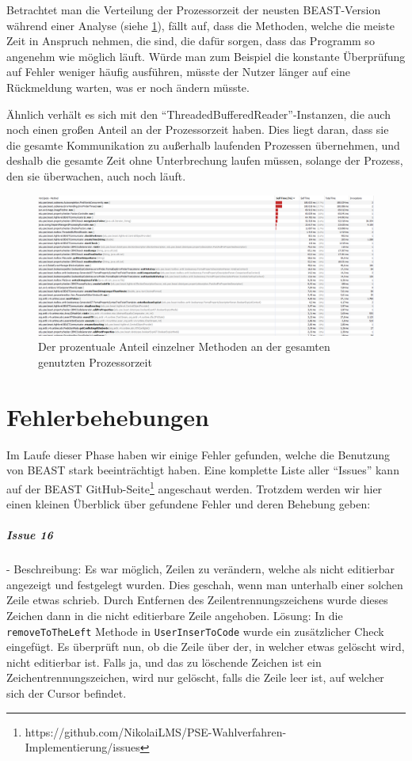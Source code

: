 \documentclass[a4paper]{scrreprt}
\begin{document}
\newpage
Betrachtet man die Verteilung der Prozessorzeit der neusten BEAST-Version während einer
Analyse (siehe \ref{fig5}), fällt auf, dass die Methoden, welche die meiste
Zeit in Anspruch nehmen, die sind, die dafür sorgen, dass das Programm
so angenehm wie möglich läuft. Würde man zum Beispiel die konstante
Überprüfung auf Fehler weniger häufig ausführen, müsste der Nutzer länger auf eine
Rückmeldung warten, was er noch ändern müsste. 

Ähnlich verhält es sich mit den
"`ThreadedBufferedReader"'-Instanzen, die auch noch einen großen Anteil an der
Prozessorzeit haben. Dies liegt daran, dass sie die gesamte Kommunikation zu
außerhalb laufenden Prozessen übernehmen, und deshalb die gesamte Zeit ohne
Unterbrechung laufen müssen, solange der Prozess, den sie überwachen, auch noch
läuft.

\begin{figure}[ht]
	\centering
  \includegraphics[width=1.0\textwidth,
  height=0.40\textwidth]{images/BEAST_PROCESSORTIME.png} \caption{Der
  prozentuale Anteil einzelner Methoden an der gesamten genutzten Prozessorzeit}
	\label{fig5}
\end{figure}

\chapter{Fehlerbehebungen}
Im Laufe dieser Phase haben wir einige Fehler gefunden, welche die Benutzung von
BEAST stark beeinträchtigt haben. Eine komplette Liste aller "`Issues"' kann auf
der BEAST
GitHub-Seite\footnote{https://github.com/NikolaiLMS/PSE-Wahlverfahren-Implementierung/issues}
angeschaut werden. Trotzdem werden wir hier einen kleinen Überblick über gefundene Fehler und deren Behebung geben:

\paragraph{Issue 16}- \newline
Beschreibung: Es war möglich, Zeilen zu verändern, welche als nicht editierbar angezeigt und festgelegt wurden. Dies geschah, wenn man unterhalb einer solchen Zeile etwas schrieb. Durch Entfernen des Zeilentrennungszeichens wurde dieses Zeichen dann in die nicht editierbare Zeile angehoben.
\newline
Lösung: In die \verb!removeToTheLeft! Methode in \verb!UserInserToCode! wurde ein zusätzlicher Check eingefügt. Es überprüft nun, ob die Zeile über der, in welcher etwas gelöscht wird, nicht editierbar ist. Falls ja, und das zu löschende Zeichen ist ein Zeichentrennungszeichen, wird nur gelöscht, falls die Zeile leer ist, auf welcher sich der Cursor befindet.
\end{document}
